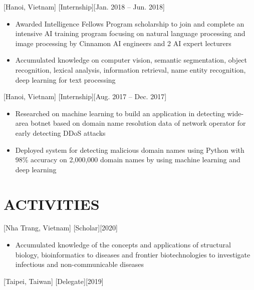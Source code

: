 \documentclass{article}
\begin{document}
[Hanoi, Vietnam]
[Internship][Jan. 2018 – Jun. 2018]

\begin{itemize}
\item Awarded Intelligence Fellows Program scholarship to join and complete an intensive AI training
program focusing on natural language processing and image processing by Cinnamon AI engineers and
2 AI expert lecturers
\item Accumulated knowledge on computer vision, semantic segmentation, object recognition, lexical
analysis, information retrieval, name entity recognition, deep learning for text processing
\end{itemize}

[Hanoi, Vietnam]
[Internship][Aug. 2017 – Dec. 2017]

\begin{itemize}
\item Researched on machine learning to build an application in detecting wide-area botnet based on domain
name resolution data of network operator for early detecting DDoS attacks
\item Deployed system for detecting malicious domain names using Python with 98\% accuracy on 2,000,000
domain names by using machine learning and deep learning
\end{itemize}


\section{ACTIVITIES}

[Nha Trang, Vietnam]
[Scholar][2020]

\begin{itemize}
\item Accumulated knowledge of the concepts and applications of structural biology, bioinformatics to
diseases and frontier biotechnologies to investigate infectious and non-communicable diseases
\end{itemize}

[Taipei, Taiwan]
[Delegate][2019]
\end{document}
